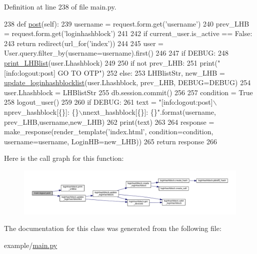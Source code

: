 Definition at line 238 of file main.\+py.


\begin{DoxyCode}
238     \textcolor{keyword}{def }\hyperlink{classmain_1_1logout_a726ef779e6bf4da8974eae3209276922}{post}(self):
239         username = request.form.get(\textcolor{stringliteral}{'username'})
240         prev\_LHB = request.form.get(\textcolor{stringliteral}{'loginhashblock'})
241 
242         \textcolor{keywordflow}{if} current\_user.is\_active == \textcolor{keyword}{False}:
243             \textcolor{keywordflow}{return} redirect(url\_for(\textcolor{stringliteral}{'index'}))
244 
245         user = User.query.filter\_by(username=username).first()
246 
247         \textcolor{keywordflow}{if} DEBUG:
248             \hyperlink{namespaceloginhashblock_a1096aa8494b9c5875decc029d8b40ea9}{print\_LHBlist}(user.Lhashblock)
249 
250         \textcolor{keywordflow}{if} \textcolor{keywordflow}{not} prev\_LHB:
251             print(\textcolor{stringliteral}{"[info:logout:post] GO TO OTP"})
252         \textcolor{keywordflow}{else}:
253             LHBlistStr, new\_LHB = \hyperlink{namespaceloginhashblock_a2bcc7ddd0fcc3788572dd77808cb624d}{update\_loginhashblocklist}(user.Lhashblock, 
      prev\_LHB, DEBUG=DEBUG)
254             user.Lhashblock = LHBlistStr
255             db.session.commit()
256 
257         condition = \textcolor{keyword}{True}
258         logout\_user()
259 
260         \textcolor{keywordflow}{if} DEBUG:
261             text = \textcolor{stringliteral}{"[info:logout:post]\(\backslash\)nprev\_hashblock[\{\}]: \{\}\(\backslash\)nnext\_hashblock[\{\}]: \{\}"}.format(username,
      prev\_LHB,username,new\_LHB)
262             print(text)
263 
264         response = make\_response(render\_template(\textcolor{stringliteral}{'index.html'}, condition=condition, username=username, 
      LoginHB=new\_LHB))
265         \textcolor{keywordflow}{return} response
266 
\end{DoxyCode}


Here is the call graph for this function\+:\nopagebreak
\begin{figure}[H]
\begin{center}
\leavevmode
\includegraphics[width=350pt]{classmain_1_1logout_a726ef779e6bf4da8974eae3209276922_cgraph}
\end{center}
\end{figure}




The documentation for this class was generated from the following file\+:\begin{DoxyCompactItemize}
\item 
example/\hyperlink{main_8py}{main.\+py}\end{DoxyCompactItemize}
